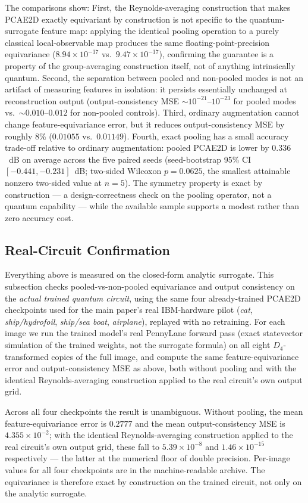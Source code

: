\documentclass[11pt]{article}
\begin{document}
The comparisons show: First, the Reynolds-averaging construction that makes PCAE2D exactly equivariant by construction is not specific to the quantum-surrogate feature map: applying the identical pooling operation to a purely classical local-observable map produces the same floating-point-precision equivariance ($8.94\times10^{-17}$ vs.\ $9.47\times10^{-17}$), confirming the guarantee is a property of the group-averaging construction itself, not of anything intrinsically quantum. Second, the separation between pooled and non-pooled modes is not an artifact of measuring features in isolation: it persists essentially unchanged at reconstruction output (output-consistency MSE $\sim10^{-21}$--$10^{-23}$ for pooled modes vs.\ $\sim0.010$--$0.012$ for non-pooled controls). Third, ordinary augmentation cannot change feature-equivariance error, but it reduces output-consistency MSE by roughly $8\%$ ($0.01055$ vs.\ $0.01149$). Fourth, exact pooling has a small accuracy trade-off relative to ordinary augmentation: pooled PCAE2D is lower by $0.336$~dB on average across the five paired seeds (seed-bootstrap 95\% CI $[-0.441,-0.231]$~dB; two-sided Wilcoxon $p=0.0625$, the smallest attainable nonzero two-sided value at $n=5$). The symmetry property is exact by construction --- a design-correctness check on the pooling operator, not a quantum capability --- while the available sample supports a modest rather than zero accuracy cost.

\subsection{Real-Circuit Confirmation}
\label{sec:d4_real_circuit}
Everything above is measured on the closed-form analytic surrogate. This subsection checks pooled-vs-non-pooled equivariance and output consistency on the \emph{actual trained quantum circuit}, using the same four already-trained PCAE2D checkpoints used for the main paper's real IBM-hardware pilot (\textit{cat}, \textit{ship/hydrofoil}, \textit{ship/sea boat}, \textit{airplane}), replayed with no retraining. For each image we run the trained model's real PennyLane forward pass (exact statevector simulation of the trained weights, not the surrogate formula) on all eight $D_4$-transformed copies of the full image, and compute the same feature-equivariance error and output-consistency MSE as above, both without pooling and with the identical Reynolds-averaging construction applied to the real circuit's own output grid.

Across all four checkpoints the result is unambiguous. Without pooling, the mean feature-equivariance error is $0.2777$ and the mean output-consistency MSE is $4.355\times10^{-2}$; with the identical Reynolds-averaging construction applied to the real circuit's own output grid, these fall to $5.39\times10^{-8}$ and $1.46\times10^{-15}$ respectively --- the latter at the numerical floor of double precision. Per-image values for all four checkpoints are in the machine-readable archive. The equivariance is therefore exact by construction on the trained circuit, not only on the analytic surrogate.
\end{document}
